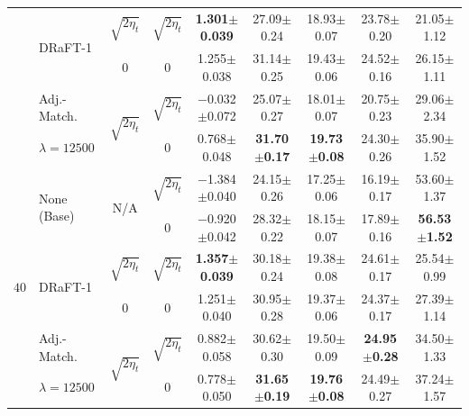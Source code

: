 \begin{table}[h!]
{\begin{tabular}{llccccccc}
    \addlinespace
     & \multirow{2}{*}{DRaFT-1}           & $\sqrt{2 \eta_t}$ & $\sqrt{2 \eta_t}$ & \textbf{1.301{\tiny$\pm$0.039}} & 27.09{\tiny$\pm$0.24} & 18.93{\tiny$\pm$0.07} & 23.78{\tiny$\pm$0.20} & 21.05{\tiny$\pm$1.12} \\
                                    &   & 0                 & 0                 & 1.255{\tiny$\pm$0.038} & 31.14{\tiny$\pm$0.25} & 19.43{\tiny$\pm$0.06} & 24.52{\tiny$\pm$0.16} & 26.15{\tiny$\pm$1.11} \\
    \addlinespace
     & Adj.-Match.  & \multirow{2}{*}{$\sqrt{2 \eta_t}$} & $\sqrt{2 \eta_t}$ & $-$0.032{\tiny$\pm$0.072} & 25.07{\tiny$\pm$0.27} & 18.01{\tiny$\pm$0.07} & 20.75{\tiny$\pm$0.23} & 29.06{\tiny$\pm$2.34} \\
     & $\lambda = 12500$                     &                                    & 0                 & 0.768{\tiny$\pm$0.048} & \textbf{31.70{\tiny$\pm$0.17}} & \textbf{19.73{\tiny$\pm$0.08}} & 24.30{\tiny$\pm$0.26} & 35.90{\tiny$\pm$1.52} \\
     \midrule
    \multirow{6}{*}{$40$} & \multirow{2}{*}{None (Base)} & \multirow{2}{*}{N/A} & $\sqrt{2 \eta_t}$ & $-$1.384{\tiny$\pm$0.040} & 24.15{\tiny$\pm$0.26} & 17.25{\tiny$\pm$0.06} & 16.19{\tiny$\pm$0.17} & 53.60{\tiny$\pm$1.37} \\
                         &        &                     & 0                 & $-$0.920{\tiny$\pm$0.042} & 28.32{\tiny$\pm$0.22} & 18.15{\tiny$\pm$0.07} & 17.89{\tiny$\pm$0.16} & \textbf{56.53{\tiny$\pm$1.52}} \\
    \addlinespace
     & \multirow{2}{*}{DRaFT-1}           & $\sqrt{2 \eta_t}$ & $\sqrt{2 \eta_t}$ & \textbf{1.357{\tiny$\pm$0.039}} & 30.18{\tiny$\pm$0.24} & 19.38{\tiny$\pm$0.08} & 24.61{\tiny$\pm$0.17} & 25.54{\tiny$\pm$0.99} \\
                                    &   & 0                 & 0                 & 1.251{\tiny$\pm$0.040} & 30.95{\tiny$\pm$0.28} & 19.37{\tiny$\pm$0.06} & 24.37{\tiny$\pm$0.17} & 27.39{\tiny$\pm$1.14} \\
    \addlinespace
     & Adj.-Match.  & \multirow{2}{*}{$\sqrt{2 \eta_t}$} & $\sqrt{2 \eta_t}$ & 0.882{\tiny$\pm$0.058} & 30.62{\tiny$\pm$0.30} & 19.50{\tiny$\pm$0.09} & \textbf{24.95{\tiny$\pm$0.28}} & 34.50{\tiny$\pm$1.33} \\
     & $\lambda = 12500$                     &                                    & 0                 & 0.778{\tiny$\pm$0.050} & \textbf{31.65{\tiny$\pm$0.19}} & \textbf{19.76{\tiny$\pm$0.08}} & 24.49{\tiny$\pm$0.27} & 37.24{\tiny$\pm$1.57} \\

\end{tabular}}
\end{table}
